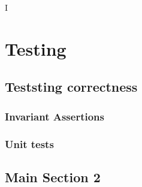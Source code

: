 I%

\chapter{Testing} %

\label{Testing} %



\section{Teststing correctness}


\subsection{Invariant Assertions}



\subsection{Unit tests}



\section{Main Section 2}
